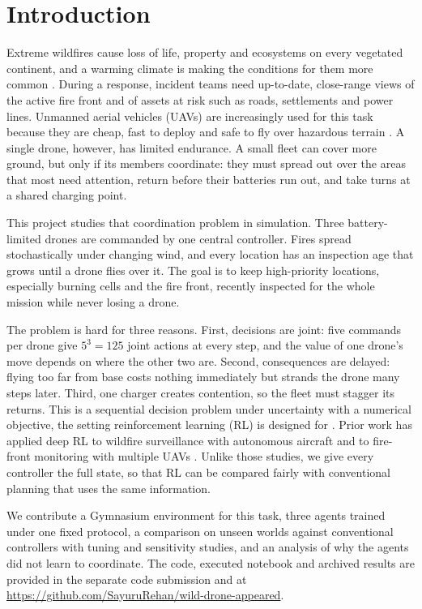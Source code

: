 \section{Introduction}

Extreme wildfires cause loss of life, property and ecosystems on every vegetated continent,
and a warming climate is making the conditions for them more common \cite{bowman2017}. During a
response, incident teams need up-to-date, close-range views of the active fire front and of
assets at risk such as roads, settlements and power lines. Unmanned aerial vehicles (UAVs)
are increasingly used for this task because they are cheap, fast to deploy and safe to fly
over hazardous terrain \cite{yuan2015}. A single drone, however, has limited endurance. A
small fleet can cover more ground, but only if its members coordinate: they must spread out
over the areas that most need attention, return before their batteries run out, and take
turns at a shared charging point.

This project studies that coordination problem in simulation. Three battery-limited drones
are commanded by one central controller. Fires spread stochastically under changing wind, and
every location has an inspection age that grows until a drone flies over it. The goal is to
keep high-priority locations, especially burning cells and the fire front, recently
inspected for the whole mission while never losing a drone.

The problem is hard for three reasons. First, decisions are joint: five commands per drone
give $5^3 = 125$ joint actions at every step, and the value of one drone's move depends on
where the other two are. Second, consequences are delayed: flying too far from base costs
nothing immediately but strands the drone many steps later. Third, one charger creates
contention, so the fleet must stagger its returns. This is a sequential decision problem
under uncertainty with a numerical objective, the setting reinforcement learning (RL) is
designed for \cite{sutton2018}. Prior work has applied
deep RL to wildfire surveillance with autonomous aircraft \cite{julian2019} and to fire-front
monitoring with multiple UAVs \cite{viseras2021}. Unlike those studies, we give every
controller the full state, so that RL can be compared fairly with conventional planning that
uses the same information.

We contribute a Gymnasium environment for this task, three agents trained under one fixed
protocol, a comparison on unseen worlds against conventional controllers with tuning and
sensitivity studies, and an analysis of why the agents did not learn to coordinate. The code,
executed notebook and archived results are provided in the separate code submission and at
\url{https://github.com/SayuruRehan/wild-drone-appeared}.

